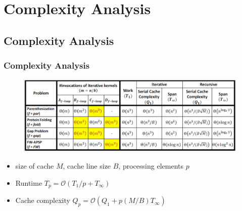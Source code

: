 \section{Complexity Analysis}

\subsection{Complexity Analysis}
\begin{frame}
    \frametitle{Complexity Analysis}
    \begin{figure}
		\includegraphics[scale=0.25]{figure/fig-complexity.png}
	\end{figure}
    \begin{itemize}
		\item size of cache $M$, cache line size $B$, processing elements $p$
		\item Runtime $T_p = \mathcal{O}(T_1/p + T_{\infty})$
		\item Cache complexity $Q_p = \mathcal{O}(Q_1 + p(M/B) T_{\infty})$
	\end{itemize}
\end{frame}